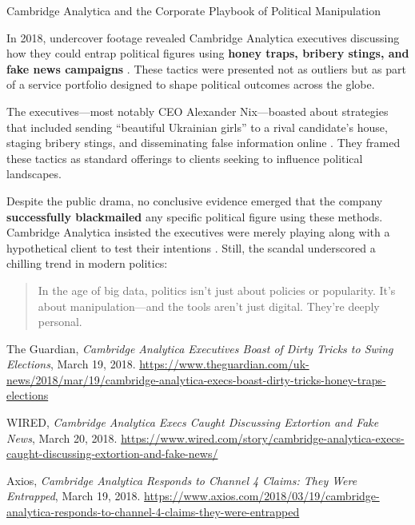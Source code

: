 \begin{HistoricalSidebar}{Cambridge Analytica and the Corporate Playbook of Political Manipulation}

    In 2018, undercover footage revealed Cambridge Analytica executives discussing how they could entrap political figures using \textbf{honey traps, bribery stings, and fake news campaigns} \cite{guardian2018}. These tactics were presented not as outliers but as part of a service portfolio designed to shape political outcomes across the globe.
    
    \medskip
    
    The executives—most notably CEO Alexander Nix—boasted about strategies that included sending “beautiful Ukrainian girls” to a rival candidate’s house, staging bribery stings, and disseminating false information online \cite{wired2018}. They framed these tactics as standard offerings to clients seeking to influence political landscapes.
    
    \medskip
    
    Despite the public drama, no conclusive evidence emerged that the company \textbf{successfully blackmailed} any specific political figure using these methods. Cambridge Analytica insisted the executives were merely playing along with a hypothetical client to test their intentions \cite{axios2018}. Still, the scandal underscored a chilling trend in modern politics:
    
    \begin{quote}
    In the age of big data, politics isn't just about policies or popularity.  
    It's about manipulation—and the tools aren't just digital. They're deeply personal.
    \end{quote}
    
    \begin{thebibliography}{9}
    The Guardian, \textit{Cambridge Analytica Executives Boast of Dirty Tricks to Swing Elections}, March 19, 2018. \url{https://www.theguardian.com/uk-news/2018/mar/19/cambridge-analytica-execs-boast-dirty-tricks-honey-traps-elections}
    
    WIRED, \textit{Cambridge Analytica Execs Caught Discussing Extortion and Fake News}, March 20, 2018. \url{https://www.wired.com/story/cambridge-analytica-execs-caught-discussing-extortion-and-fake-news/}
    
    Axios, \textit{Cambridge Analytica Responds to Channel 4 Claims: They Were Entrapped}, March 19, 2018. \url{https://www.axios.com/2018/03/19/cambridge-analytica-responds-to-channel-4-claims-they-were-entrapped}
    \end{thebibliography}
    
\end{HistoricalSidebar}

